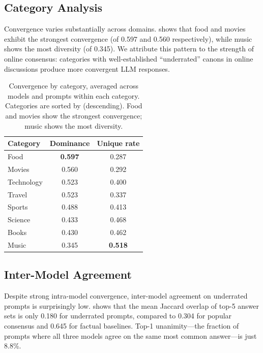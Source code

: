 \subsection{Category Analysis}
\label{sec:category}

Convergence varies substantially across domains.  shows that food and movies exhibit the strongest convergence (\dominance of 0.597 and 0.560 respectively), while music shows the most diversity (\dominance of 0.345). We attribute this pattern to the strength of online consensus: categories with well-established ``underrated'' canons in online discussions produce more convergent LLM responses.

\begin{table}[t]
    \centering
    \caption{Convergence by category, averaged across models and prompts within each category. Categories are sorted by \dominance (descending). Food and movies show the strongest convergence; music shows the most diversity.}
    \begin{tabular}{@{}lcc@{}}
        \toprule
        \textbf{Category} & \textbf{Dominance} & \textbf{Unique rate} \\
        \midrule
        Food & \textbf{0.597} & 0.287 \\
        Movies & 0.560 & 0.292 \\
        Technology & 0.523 & 0.400 \\
        Travel & 0.523 & 0.337 \\
        Sports & 0.488 & 0.413 \\
        Science & 0.433 & 0.468 \\
        Books & 0.430 & 0.462 \\
        Music & 0.345 & \textbf{0.518} \\
        \bottomrule
    \end{tabular}
    \label{tab:category}
\end{table}

\subsection{Inter-Model Agreement}
\label{sec:inter}

Despite strong intra-model convergence, inter-model agreement on underrated prompts is surprisingly low.  shows that the mean Jaccard overlap of top-5 answer sets is only 0.180 for underrated prompts, compared to 0.304 for popular consensus and 0.645 for factual baselines. Top-1 unanimity---the fraction of prompts where all three models agree on the same most common answer---is just 8.8\%.

